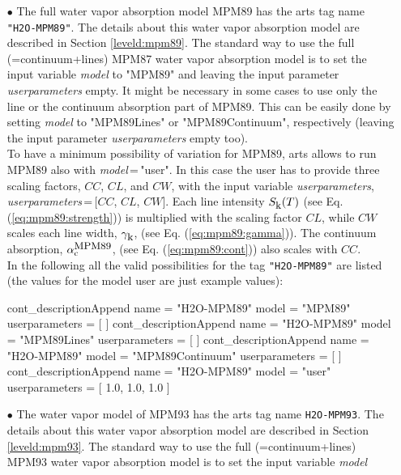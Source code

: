 \begin{itemize}
\item[$\bullet$] The full water vapor absorption model MPM89 \citep{liebe:89} 
     has the arts tag name {\tt "H2O-MPM89"}. The details about 
     this water vapor absorption model are described in 
     Section \ref{leveld:mpm89}.
     The standard way to use the full (=continuum+lines) MPM87 water 
     vapor absorption model is to set the input variable {\it model} 
     to "MPM89" and leaving the input parameter {\it userparameters} empty. 
     It might be necessary in some cases to use only the line or the 
     continuum absorption part of MPM89. This can be easily done 
     by setting {\it model} to "MPM89Lines" or "MPM89Continuum", 
     respectively (leaving the input parameter {\it userparameters} 
     empty too).\\ To have a minimum possibility of variation for MPM89, 
     arts allows to run MPM89 also with {\it model}\,=\,"user". 
     In this case the user has to provide three scaling factors,  
     $CC$, $CL$, and $CW$, with the input variable {\it userparameters}, 
     {\it userparameters}\,=\,$[$$CC$, $CL$, $CW$$]$. 
     Each line intensity $S_{\mbox{\rm \small k}}(T)$ (see Eq. (\ref{eq:mpm89:strength})) 
     is multiplied with the scaling factor $CL$, while $CW$ scales 
     each line width, $\gamma_{\mbox{\rm \small k}}$, (see Eq. (\ref{eq:mpm89:gamma})). 
     The continuum absorption, $\alpha^{\mbox{\rm \small MPM89}}_{\rm c}$, 
     (see Eq. (\ref{eq:mpm89:cont})) also scales with $CC$.\\
     In the following all the valid possibilities for the
     tag {\tt "H2O-MPM89"} are listed (the values for the 
     model user are just example values): 
\begin{code}
cont_descriptionAppend{
    name           = "H2O-MPM89"
    model          = "MPM89"
    userparameters = [ ]
}
cont_descriptionAppend{
    name           = "H2O-MPM89"
    model          = "MPM89Lines"
    userparameters = [ ]
}
cont_descriptionAppend{
    name           = "H2O-MPM89"
    model          = "MPM89Continuum"
    userparameters = [ ]
}
cont_descriptionAppend{
    name           = "H2O-MPM89"
    model          = "user"
    userparameters = [ 1.0, 1.0, 1.0 ]
}
\end{code}
\item[$\bullet$] The water vapor model of MPM93 \citep{liebeetal:93}
     has the arts tag name {\tt H2O-MPM93}. The details about this water vapor 
     absorption model are described in Section \ref{leveld:mpm93}.
     The standard way to use the full (=continuum+lines) MPM93 water 
     vapor absorption model is to set the input variable {\it model} 

\end{itemize}
